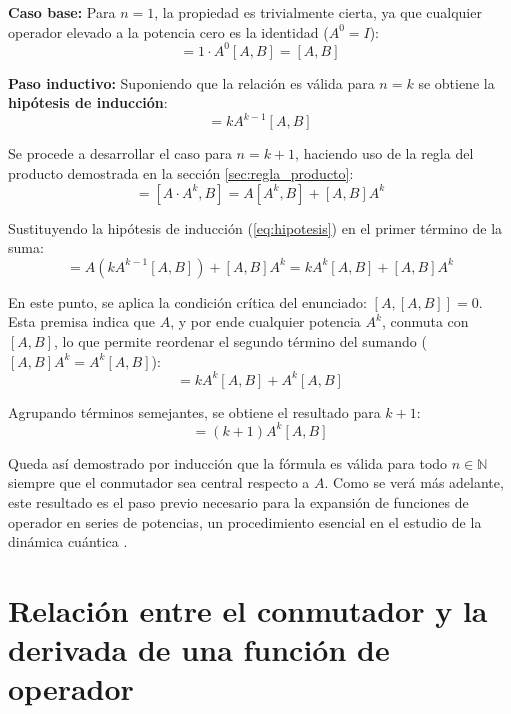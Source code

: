 \documentclass[11pt,a4paper,spanish]{book}
\begin{document}
\textbf{Caso base:} Para $n=1$, la propiedad es trivialmente cierta, ya que cualquier operador elevado a la potencia cero es la identidad ($A^0 = I$):
\begin{equation}
    [A^1, B] = 1 \cdot A^0 [A, B] = [A, B]
\end{equation}

\textbf{Paso inductivo:} Suponiendo que la relación es válida para $n=k$ se obtiene la \textbf{hipótesis de inducción}:
\begin{equation}
    [A^k, B] = k A^{k-1} [A, B] \label{eq:hipotesis}
\end{equation}

Se procede a desarrollar el caso para $n=k+1$, haciendo uso de la regla del producto demostrada en la sección \ref{sec:regla_producto}:
\begin{equation}
    [A^{k+1}, B] = [A \cdot A^k, B] = A[A^k, B] + [A, B]A^k
\end{equation}

Sustituyendo la hipótesis de inducción (\ref{eq:hipotesis}) en el primer término de la suma:
\begin{equation}
    [A^{k+1}, B] = A(k A^{k-1} [A, B]) + [A, B]A^k = k A^k [A, B] + [A, B]A^k
\end{equation}

En este punto, se aplica la condición crítica del enunciado: $[A, [A, B]] = 0$. Esta premisa indica que $A$, y por ende cualquier potencia $A^k$, conmuta con $[A, B]$, lo que permite reordenar el segundo término del sumando ($[A, B]A^k = A^k[A, B]$):
\begin{equation}
    [A^{k+1}, B] = k A^k [A, B] + A^k [A, B]
\end{equation}

Agrupando términos semejantes, se obtiene el resultado para $k+1$:
\begin{equation}
    [A^{k+1}, B] = (k+1) A^k [A, B] \label{eq:induccion_n}
\end{equation}

Queda así demostrado por inducción que la fórmula es válida para todo $n \in \mathbb{N}$ siempre que el conmutador sea central respecto a $A$. Como se verá más adelante, este resultado es el paso previo necesario para la expansión de funciones de operador en series de potencias, un procedimiento esencial en el estudio de la dinámica cuántica \citep{nielsen2010}.

\section{Relación entre el conmutador y la derivada de una función de operador} \label{sec:derivada_funcion}
\end{document}

